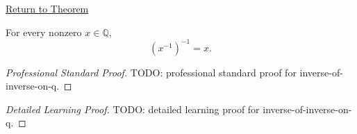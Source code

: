 \newpage
{}
\label{prf:inverse-of-inverse-on-q}

\begin{remark*}[Return]
\hyperref[cor:inverse-of-inverse-on-q]{Return to Theorem}
\end{remark*}

\begin{corollary*}
For every nonzero $x\in\mathbb{Q}$,
\[
(x^{-1})^{-1}=x.
\]
\end{corollary*}

\begin{proof}[Professional Standard Proof]
\LRAProofBodyStart
TODO: professional standard proof for inverse-of-inverse-on-q.
\end{proof}

\begin{proof}[Detailed Learning Proof]
\LRAProofBodyStart
TODO: detailed learning proof for inverse-of-inverse-on-q.
\end{proof}

\begin{remark*}
\end{remark*}

\NoLocalDependencies

\clearpage
